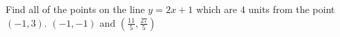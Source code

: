 {Find all of the points on the line $y=2x+1$ which are $4$ units from the point $(-1,3)$.}
{$(-1,-1)$ and $\left(\frac{11}{5}, \frac{27}{5}\right)$}